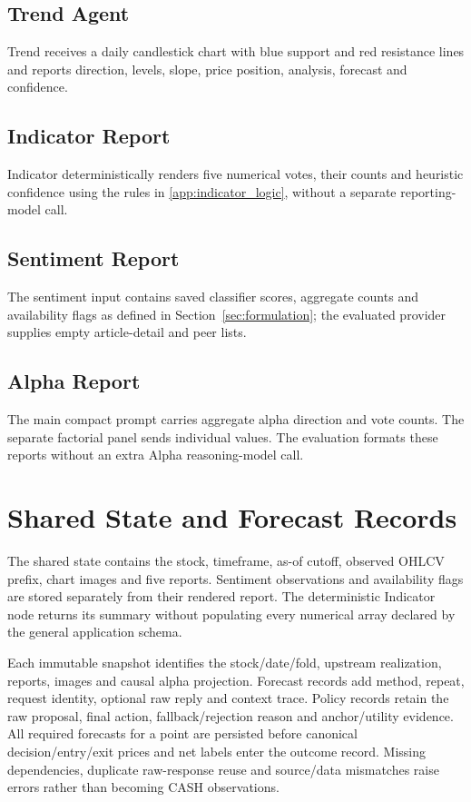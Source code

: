 \subsection{Trend Agent}
\label{app:prompt_trend}
Trend receives a daily candlestick chart with blue support and red resistance lines and reports direction, levels, slope, price position, analysis, forecast and confidence.

\subsection{Indicator Report}
\label{app:prompt_indicator}
Indicator deterministically renders five numerical votes, their counts and heuristic confidence using the rules in \ref{app:indicator_logic}, without a separate reporting-model call.

\subsection{Sentiment Report}
\label{app:prompt_sentiment}
The sentiment input contains saved classifier scores, aggregate counts and availability flags as defined in Section~\ref{sec:formulation}; the evaluated provider supplies empty article-detail and peer lists.

\subsection{Alpha Report}
\label{app:prompt_alpha}
The main compact prompt carries aggregate alpha direction and vote counts. The separate factorial panel sends individual values. The evaluation formats these reports without an extra Alpha reasoning-model call.

\section{Shared State and Forecast Records}
\label{app:state_schema}
The shared state contains the stock, timeframe, as-of cutoff, observed OHLCV prefix, chart images and five reports. Sentiment observations and availability flags are stored separately from their rendered report. The deterministic Indicator node returns its summary without populating every numerical array declared by the general application schema.

Each immutable snapshot identifies the stock/date/fold, upstream realization, reports, images and causal alpha projection. Forecast records add method, repeat, request identity, optional raw reply and context trace. Policy records retain the raw proposal, final action, fallback/rejection reason and anchor/utility evidence. All required forecasts for a point are persisted before canonical decision/entry/exit prices and net labels enter the outcome record. Missing dependencies, duplicate raw-response reuse and source/data mismatches raise errors rather than becoming CASH observations.

